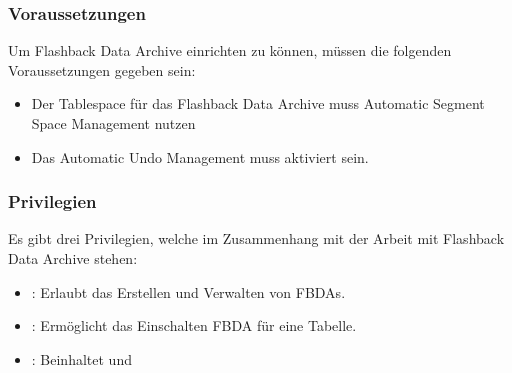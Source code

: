         \subsubsection{Voraussetzungen}
          Um Flashback Data Archive einrichten zu k\"onnen, m\"ussen die folgenden Voraussetzungen gegeben sein:
          \begin{itemize}
            \item Der Tablespace f\"ur das Flashback Data Archive muss Automatic Segment Space Management nutzen
            \item Das Automatic Undo Management muss aktiviert sein.
          \end{itemize}
        \subsubsection{Privilegien}
          Es gibt drei Privilegien, welche im Zusammenhang mit der Arbeit mit Flashback Data Archive stehen:
          \begin{itemize}
            \item {}: Erlaubt das Erstellen und Verwalten von FBDAs.
            \item {}: Erm\"oglicht das Einschalten FBDA f\"ur eine Tabelle.
            \item {}: Beinhaltet  und 
          \end{itemize}
